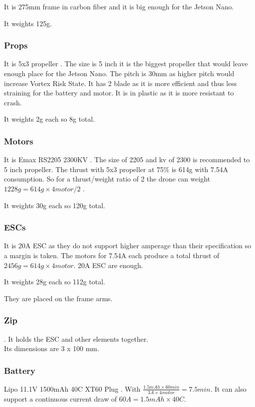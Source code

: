 It is 275mm frame in carbon fiber and it is big enough for the Jetson Nano.

It weights 125g.

\subsubsection{Props}
It is 5x3 propeller \cite{bangood_propeller}. The size is 5 inch it is the biggest propeller that would leave enough place for the Jetson Nano. The pitch is 30mm as higher pitch would increase Vortex Risk State. It has 2 blade as it is more efficient and thus less straining for the battery and motor. It is in plastic as it is more resistant to crash.

It weights 2g each so 8g total.

\subsubsection{Motors}
It is Emax RS2205 2300KV \cite{bangood_motor}. The size of 2205 and kv of 2300 is recommended to 5 inch propeller. The thrust with 5x3 propeller at 75\% is 614g with 7.54A consumption. So for a thrust/weight ratio of 2 the drone can weight $1228g=614g \times 4motor / 2$ \cite{google_sheets_motor}.

It weights 30g each so 120g total.

\subsubsection{ESCs}
It is 20A ESC \cite{bangood_esc} as they do not support higher amperage than their specification so a margin is taken. The motors for 7.54A each produce a total thrust of $2456g=614g\times 4motor$. 20A ESC are enough.

It weights 28g each so 112g total.

They are placed on the frame arms.

\subsubsection{Zip}
\cite{bangood_zip_ties}. It holds the ESC and other elements together.\\
Its dimensions are 3 x 100 mm.

\subsubsection{Battery}
Lipo 11.1V 1500mAh 40C XT60 Plug \cite{bangood_battery}. With $ \frac{1.5mAh \times 60min}{3A \times 4motor}= 7.5min$. It can also support a continuous current draw of $60A = 1.5mAh\times 40C$.

